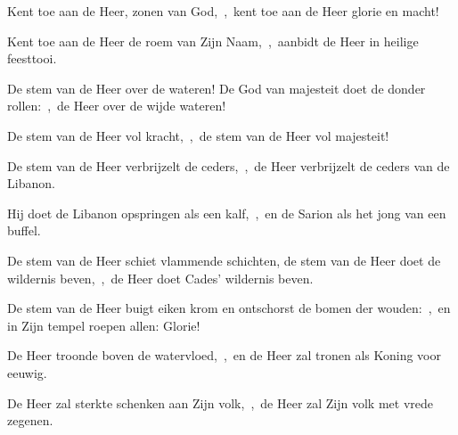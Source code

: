 \documentclass[12pt,twoside,a5paper]{article}
\begin{document}
\begin{halfparskip}
   Kent toe aan de Heer, zonen van God,~\sep\ kent toe aan de Heer glorie en macht!

  Kent toe aan de Heer de roem van Zijn Naam,~\sep\ aanbidt de Heer in heilige feesttooi.

  De stem van de Heer over de wateren! De God van majesteit doet de donder rollen:~\sep\ de Heer over de wijde wateren!

  De stem van de Heer vol kracht,~\sep\ de stem van de Heer vol majesteit!

  De stem van de Heer verbrijzelt de ceders,~\sep\ de Heer verbrijzelt de ceders van de Libanon.

  Hij doet de Libanon opspringen als een kalf,~\sep\ en de Sarion als het jong van een buffel.

  De stem van de Heer schiet vlammende schichten, de stem van de Heer doet de wildernis beven,~\sep\ de Heer doet Cades' wildernis beven.

  De stem van de Heer buigt eiken krom en ontschorst de bomen der wouden:~\sep\ en in Zijn tempel roepen allen: Glorie!

  De Heer troonde boven de watervloed,~\sep\ en de Heer zal tronen als Koning voor eeuwig.

  De Heer zal sterkte schenken aan Zijn volk,~\sep\ de Heer zal Zijn volk met vrede zegenen.
\end{halfparskip}
\end{document}
